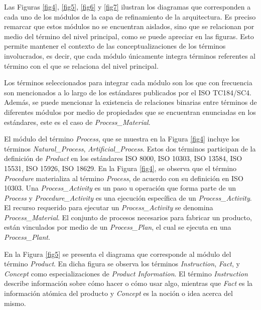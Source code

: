 \documentclass[journal]{IEEEtran}
\begin{document}
Las Figuras \ref{fig4}, \ref{fig5}, \ref{fig6} y \ref{fig7} ilustran los diagramas que corresponden a cada uno de los m\'odulos de la capa de refinamiento de la arquitectura. Es preciso remarcar que estos m\'odulos no se encuentran aislados, sino que se relacionan por medio del t\'ermino del nivel principal, como se puede apreciar en las figuras. Esto permite mantener el contexto de las conceptualizaciones de los t\'erminos involucrados, es decir, que cada m\'odulo \'unicamente integra t\'erminos referentes al t\'ermino con el que se relaciona del nivel principal.

Los t\'erminos seleccionados para integrar cada m\'odulo son los que con frecuencia son mencionados a lo largo de los est\'andares publicados por el ISO TC184/SC4. Adem\'as, se puede mencionar la existencia de relaciones binarias entre t\'erminos de diferentes m\'odulos por medio de propiedades que se encuentran enunciadas en los est\'andares, este es el caso de \emph{Process\_Material}.

El m\'odulo del t\'ermino \emph{Process}, que se muestra en la Figura \ref{fig4} incluye los t\'erminos \emph{Natural\_Process}, \emph{Artificial\_Process}. Estos dos t\'erminos participan de la definici\'on de \emph{Product} en los est\'andares ISO 8000, ISO 10303, ISO 13584, ISO 15531, ISO 15926, ISO 18629. En la Figura \ref{fig4}, se observa que el t\'ermino \emph{Procedure} materializa al t\'ermino \emph{Process}, de acuerdo con su definici\'on en ISO 10303. Una \emph{Process\_Activity} es un paso u operaci\'on que forma parte de un \emph{Process} y \emph{Procedure\_Activity} es una ejecuci\'on espec\'ifica de un \emph{Process\_Activity}. El recurso requerido para ejecutar un \emph{Process\_Activity} se denomina \emph{Process\_Material}. El conjunto de procesos necesarios para fabricar un producto, est\'an vinculados por medio de un \emph{Process\_Plan}, el cual se ejecuta en una \emph{Process\_Plant}.

En la Figura \ref{fig5} se presenta el diagrama que corresponde al m\'odulo del t\'ermino \emph{Product}. En dicha figura se observa los t\'erminos \emph{Instruction}, \emph{Fact}, y \emph{Concept} como especializaciones de \emph{Product Information}. El t\'ermino \emph{Instruction} describe informaci\'on sobre c\'omo hacer o c\'omo usar algo, mientras que \emph{Fact} es la informaci\'on at\'omica del producto y \emph{Concept} es la noci\'on o idea acerca del mismo.
\end{document}
